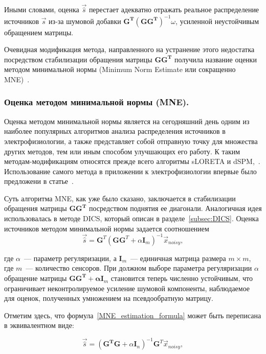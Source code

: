 Иными словами, оценка $\vec{\hat{s}}$ перестает адекватно отражать реальное распределение
источников $\vec{s}$ из-за шумовой добавки $\mathbf{G^T{(GG^T)}}^{-1}\omega$, усиленной
неустойчивым обращением матрицы.

Очевидная модификация метода, направленного на устранение этого недостатка
посредством стабилизации обращения матрицы $\mathbf{GG^T}$ получила название
оценки методом минимальной нормы (Minimum Norm Estimate или сокращенно MNE)~\cite{Hamalainen1994}.

\subsubsection{Оценка методом минимальной нормы (MNE).}\label{subsubsec:MNE}

Оценка методом минимальной нормы является на сегодняшний день одним из наиболее
популярных алгоритмов анализа распределения источников в электрофизиологии, а
также представляет собой отправную точку для множества других методов, тем или
иным способом улучшающих его работу. К таким методам-модификациям относятся
прежде всего алгоритмы sLORETA и dSPM,~\cite{Pascual-Marqui2002, Dale2000}.
Использование самого метода в приложении к электрофизиологии впервые было предложени
в статье~\cite{Hamalainen1994}.

Суть алгоритма MNE, как уже было сказано, заключается в стабилизации обращения
матрицы $\mathbf{GG^T}$ посредством поднятия ее диагонали. Аналогичная идея
использовалась в методе DICS, который описан в разделе~\ref{subsec:DICS}.
Оценка источников методом минимальной нормы задается соотношением
\begin{equation}
    \vec{\hat{s}} = \mathbf{G}^T{(\mathbf{GG}^T + \alpha \mathbf{I}_m)}^{-1}\vec{x}_{noisy},
    \label{MNE_estimation_formula}
\end{equation}

где $\alpha$~--- параметр регуляризации, а $\mathbf{I}_m$~--- единичная матрица
размера $m \times m$, где $m$~--- количество сенсоров. При должном выборе параметра
регуляризации $\alpha$ обращение матрицы $\mathbf{GG^T + \alpha I}_m$
становится теперь численно устойчивым, что ограничивает неконтролируемое
усиление шумовой компоненты, наблюдаемое для оценок, полученных умножением на
псевдообратную матрицу.

Отметим здесь, что формула~\ref{MNE_estimation_formula} может быть переписана в
эквивалентном виде:

\begin{equation}
    \vec{\hat{s}} = {(\mathbf{G^TG} + \alpha \mathbf{I}_n)}^{-1}\mathbf{G}^T\vec{x}_{noisy},
    \label{MNE_estimation_formula_v2}
\end{equation}

